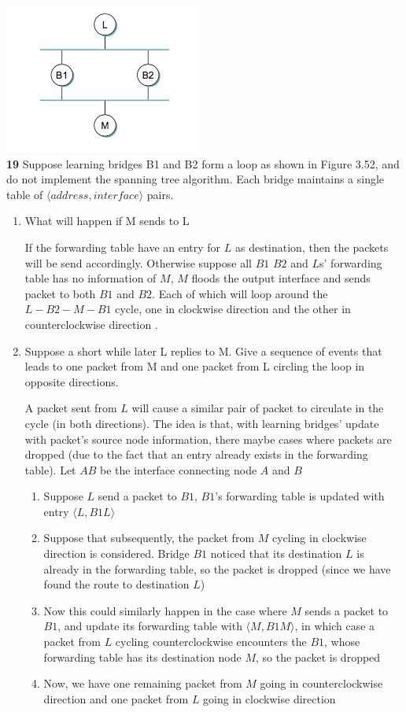 \documentclass[11pt]{article}
\begin{document}
\includegraphics{ch3_19}\\
\textbf{19} Suppose learning bridges B1 and B2 form a loop as shown in Figure 3.52, and do not implement the spanning tree algorithm. Each bridge maintains a single table of $\langle address, interface\rangle$ pairs.
\begin{enumerate}
    \item What will happen if M sends to L
    \begin{solution}
        If the forwarding table have an entry for $L$ as destination, then the packets will be send accordingly. Otherwise suppose all $B1$ $B2$ and $L$s' forwarding table has no information of $M$, $M$ floods the output interface and sends packet to both $B1$ and $B2$. Each of which will loop around the $L-B2-M-B1$ cycle, one in clockwise direction and the other in counterclockwise direction .
    \end{solution}
    \item Suppose a short while later L replies to M. Give a sequence of events that leads to one packet from M and one packet from L circling the loop in opposite directions.
    \begin{solution}
        A packet sent from $L$ will cause a similar pair of packet to circulate in the cycle (in both directions). The idea is that, with learning bridges' update with packet's source node information, there maybe cases where packets are dropped (due to the fact that an entry already exists in the forwarding table). Let $AB$ be the interface connecting node $A$ and $B$
        \begin{enumerate}
            \item Suppose $L$ send a packet to $B1$, $B1$'s forwarding table is updated with entry $\langle L, B1L\rangle$
            \item Suppose that subsequently, the packet from $M$ cycling in clockwise direction is considered. Bridge $B1$ noticed that its destination $L$ is already in the forwarding table, so the packet is dropped (since we have found the route to destination $L$)
            \item Now this could similarly happen in the case where $M$ sends a packet to $B1$, and update its forwarding table with $\langle M, B1M\rangle$, in which case a packet from $L$ cycling counterclockwise encounters the $B1$, whose forwarding table has its destination node $M$, so the packet is dropped 
            \item Now, we have one remaining packet from $M$ going in counterclockwise direction and one packet from $L$ going in clockwise direction
        \end{enumerate}
    \end{solution}
\end{enumerate}
\end{document}
